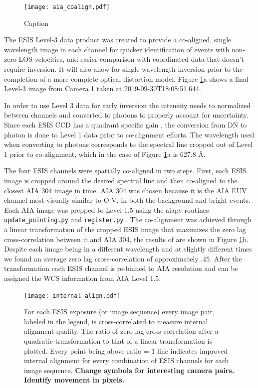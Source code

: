     
   		\begin{figure}[htb!]
    		\centering
    		\texttt{[image: aia\_coalign.pdf]}
    		\caption{Caption}
    		\label{fig:coalign}
    	\end{figure}
    
    	\newcommand{\levthreetime}{2019-09-30T18:08:51.644}
    	The ESIS Level-3 data product was created to provide a co-aligned, single wavelength image in each channel for quicker identification of events with non-zero LOS velocities, and easier comparison with coordinated data that doesn't require inversion. 
    	It will also allow for single wavelength inversion prior to the completion of a more complete optical distortion model.
    	Figure \ref{fig:coalign}a shows a final Level-3 image from Camera 1 taken at \levthreetime.
    
     	In order to use Level 3 data for early inversion the intensity needs to normalized between channels and converted to photons to properly account for uncertainty.
   		Since each ESIS CCD has a quadrant specific gain \citep{ESIS}, the conversion from DN to photon is done to Level 1 data prior to co-alignment efforts.
   		The wavelength used when converting to photons corresponds to the spectral line cropped out of Level 1 prior to co-alignment, which in the case of Figure \ref{fig:coalign}a is 627.8 \AA.
   		
   		The four ESIS channels were spatially co-aligned in two steps.  
   		First, each ESIS image is cropped around the desired spectral line and then co-aligned to the closest AIA 304 image in time.  
   		AIA 304 was chosen because it is the AIA EUV channel most visually similar to O V, in both the background and bright events.
   		Each AIA image was prepped to Level-1.5 using the aiapy routines \texttt{update\_pointing.py} and \texttt{register.py} \citep{aiapy}.
   		The co-alignment was achieved through a linear transformation of the cropped ESIS image that maximizes the zero lag cross-correlation between it and AIA 304, the results of are shown in Figure \ref{fig:coalign}b.
   		Despite each image being in a different wavelength and at slightly different times we found an average zero lag cross-correlation of approximately $.45$.
   		After the transformation each ESIS channel is re-binned to AIA resolution and can be assigned the WCS information from AIA Level 1.5.

    	\begin{figure}[htb!]
    		\centering
    		\texttt{[image: internal\_align.pdf]}
    		\caption{For each ESIS exposure (or image sequence) every image pair, labeled in the legend, is cross-correlated to measure internal alignment quality.  The ratio of zero lag cross-correlation after a quadratic transformation to that of a linear transformation is plotted.  Every point being above ratio = 1 line indicates improved internal alignment for every combination of ESIS channels for each image sequence. \textbf{Change symbols for interesting camera pairs.  Identify movement in pixels.}}
    		\label{fig:cc}	
    	\end{figure}
    
